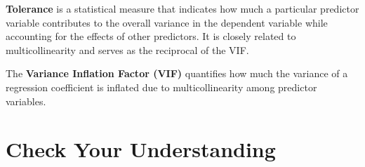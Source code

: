 \documentclass[
  letterpaper,
  DIV=11,
  numbers=noendperiod]{scrreprt}
\begin{document}
\textbf{Tolerance} is a statistical measure that indicates how much a
particular predictor variable contributes to the overall variance in the
dependent variable while accounting for the effects of other predictors.
It is closely related to multicollinearity and serves as the reciprocal
of the VIF.

The \textbf{Variance Inflation Factor (VIF)} quantifies how much the
variance of a regression coefficient is inflated due to
multicollinearity among predictor variables.

\section*{Check Your Understanding}\label{check-your-understanding-11}

\end{document}
